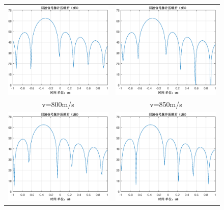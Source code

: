 \documentclass[12pt]{article}
\begin{document}
\begin{figure}[htbp]
  \centering
  \begin{tabular}{cc}
    \includegraphics[width=.5\textwidth]{Doppler_sensitivity_0800}&\includegraphics[width=.5\textwidth]{Doppler_sensitivity_0850}\\
    v=800m/s&v=850m/s\\
    \includegraphics[width=.5\textwidth]{Doppler_sensitivity_0900}&\includegraphics[width=.5\textwidth]{Doppler_sensitivity_0950}\\

\end{tabular}
\end{figure}
\end{document}
